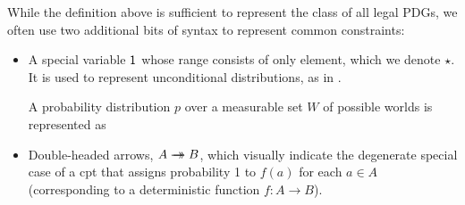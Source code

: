 \documentclass{article}
\newcommand{\doubleheadrightarrow}{%
	\rightarrow\mathrel{\mspace{-15mu}}\rightarrow}
\newcommand{\MN}{PDG}
\newcommand{\MNs}{\MN s}
\numberwithin{equation}{section}
\begin{document}
	While the definition above is sufficient to represent the class of all legal \MNs,
	we often use two additional bits of syntax to represent common constraints:  
	\begin{itemize}
	\item A special variable $\sf 1$ 
whose range consists of only element, which we denote $\star$.
It is used to represent
          unconditional distributions, as in
                  .  
	\begin{vleftovers}
		\begin{examplex}\label{ex:worldsonly}
			A probability distribution $p$ over a measurable set $W$ of possible worlds is represented as 
			\begin{center}
			\end{center}
		\end{examplex}
	\end{vleftovers}
		\item Double-headed arrows, $A \doubleheadrightarrow
                  B$, which visually indicate the degenerate special
                  case of a cpt that assigns probability 1 to $f(a)$
                  for each $a \in A$ (corresponding to a deterministic
                  function $f : A \to B$). 
	\end{itemize}
\end{document}
